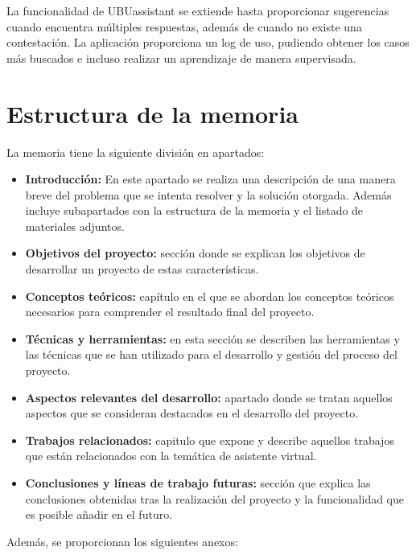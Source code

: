La funcionalidad de UBUassistant se extiende hasta proporcionar sugerencias cuando encuentra múltiples respuestas, además de cuando no existe una contestación. La aplicación proporciona un log de uso, pudiendo obtener los casos más buscados e incluso realizar un aprendizaje de manera supervisada.

\section{Estructura de la memoria}\label{estructura-de-la-memoria}
La memoria tiene la siguiente división en apartados:

\begin{itemize}
\tightlist
\item
  \textbf{Introducción:} En este apartado se realiza una descripción de una manera breve del problema que se intenta resolver y la solución otorgada. Además incluye subapartados con la estructura de la memoria y el listado de materiales adjuntos.
\item
  \textbf{Objetivos del proyecto:} sección donde se explican los objetivos de desarrollar un proyecto de estas características.
\item
  \textbf{Conceptos teóricos:} capítulo en el que se abordan los conceptos teóricos necesarios para comprender el resultado final del proyecto.
\item
  \textbf{Técnicas y herramientas:} en esta sección se describen las herramientas y las técnicas que se han utilizado para el desarrollo y gestión del proceso del proyecto.
\item
  \textbf{Aspectos relevantes del desarrollo:} apartado donde se tratan aquellos aspectos que se consideran destacados en el desarrollo del proyecto.
\item
  \textbf{Trabajos relacionados:} capitulo que expone y describe aquellos trabajos que están relacionados con la temática de asistente virtual.
\item
  \textbf{Conclusiones y líneas de trabajo futuras:} sección que explica las conclusiones obtenidas tras la realización del proyecto y la funcionalidad que es posible añadir en el futuro.
\end{itemize}

Además, se proporcionan los siguientes anexos:

